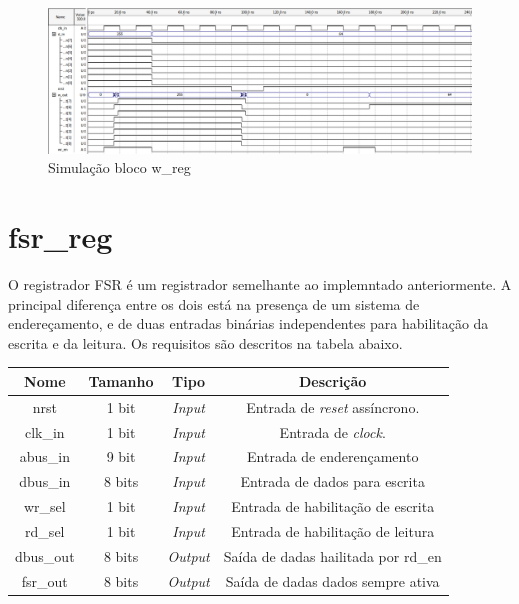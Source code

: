 \documentclass{article}
\begin{document}
\begin{figure}[ht]
\begin{center}
    \includegraphics[width=15cm]{images/w_reg.png}
    \caption{Simulação bloco w\_reg}
\end{center}
\end{figure}

\section{fsr\_reg}

O registrador FSR é um registrador semelhante ao implemntado anteriormente. A principal diferença entre os dois está na presença de um sistema de endereçamento, e de duas entradas binárias independentes para habilitação da escrita e da leitura. Os requisitos são descritos na tabela abaixo.

\begin{center}
\begin{tabular}{|c|c|c|c|}
        \hline
        Nome & Tamanho & Tipo & Descrição\\
        \hline
        nrst & 1 bit & \textit{Input} & Entrada de \textit{reset} assíncrono.\\
        \hline
        clk\_in & 1 bit & \textit{Input} & Entrada de \textit{clock}.\\
        \hline
        abus\_in & 9 bit & \textit{Input} & Entrada de enderençamento\\
        \hline
        dbus\_in & 8 bits & \textit{Input} & Entrada de dados para escrita\\
        \hline
        wr\_sel & 1 bit & \textit{Input} & Entrada de habilitação de escrita\\
        \hline
        rd\_sel & 1 bit & \textit{Input} & Entrada de habilitação de leitura\\
        \hline
        dbus\_out & 8 bits & \textit{Output} & Saída de dadas hailitada por rd\_en\\
        \hline
        fsr\_out & 8 bits & \textit{Output} & Saída de dadas dados sempre ativa\\
        \hline
\end{tabular}
\end{center}
\end{document}
